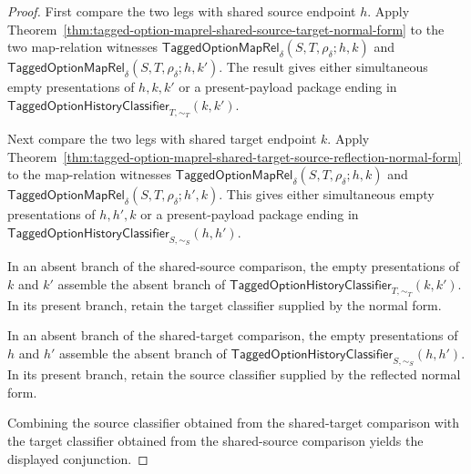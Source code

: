 \begin{proof}
First compare the two legs with shared source endpoint $h$. Apply
Theorem~\ref{thm:tagged-option-maprel-shared-source-target-normal-form} to the
two map-relation witnesses
$\mathsf{TaggedOptionMapRel}_{\delta}(S,T,\rho_{\delta};h,k)$ and
$\mathsf{TaggedOptionMapRel}_{\delta}(S,T,\rho_{\delta};h,k')$. The result gives
either simultaneous empty presentations of $h,k,k'$ or a present-payload
package ending in
$\mathsf{TaggedOptionHistoryClassifier}_{T,\sim_T}(k,k')$.

Next compare the two legs with shared target endpoint $k$. Apply
Theorem~\ref{thm:tagged-option-maprel-shared-target-source-reflection-normal-form}
to the map-relation witnesses
$\mathsf{TaggedOptionMapRel}_{\delta}(S,T,\rho_{\delta};h,k)$ and
$\mathsf{TaggedOptionMapRel}_{\delta}(S,T,\rho_{\delta};h',k)$. This gives
either simultaneous empty presentations of $h,h',k$ or a present-payload
package ending in
$\mathsf{TaggedOptionHistoryClassifier}_{S,\sim_S}(h,h')$.

In an absent branch of the shared-source comparison, the empty presentations of
$k$ and $k'$ assemble the absent branch of
$\mathsf{TaggedOptionHistoryClassifier}_{T,\sim_T}(k,k')$. In its present
branch, retain the target classifier supplied by the normal form.

In an absent branch of the shared-target comparison, the empty presentations of
$h$ and $h'$ assemble the absent branch of
$\mathsf{TaggedOptionHistoryClassifier}_{S,\sim_S}(h,h')$. In its present
branch, retain the source classifier supplied by the reflected normal form.

Combining the source classifier obtained from the shared-target comparison with
the target classifier obtained from the shared-source comparison yields the
displayed conjunction.
\end{proof}

